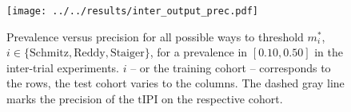 \begin{figure}
    \centering
    \texttt{[image: ../../results/inter\_output\_prec.pdf]}
    \caption{Prevalence versus precision for all possible ways to threshold $m^*_i$, $i \in 
        \{ \text{Schmitz}, \text{Reddy}, \text{Staiger} \}$, for a prevalence in $[\num{0.10}, 
        \num{0.50}]$ in the inter-trial experiments. $i$ -- or the 
        training cohort -- corresponds to the rows, the test cohort varies to the columns. The 
        dashed gray line marks the precision of the $\text{tIPI}$ on the respective cohort.}
    \label{fig:inter-output-prec}
\end{figure}